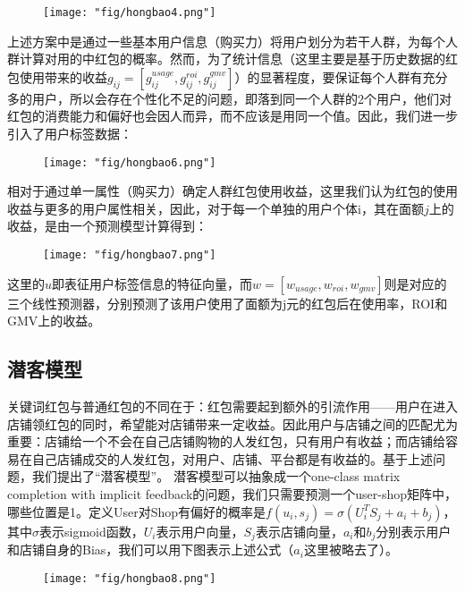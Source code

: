 \begin{figure}[!h]
	\centering
	\texttt{[image: "fig/hongbao4.png"]}
	\caption{}
	\label{fig:hongbao4}
\end{figure}

 
上述方案中是通过一些基本用户信息（购买力）将用户划分为若干人群，为每个人群计算对用的中红包的概率。然而，为了统计信息（这里主要是基于历史数据的红包使用带来的收益$g_{ij}=[g_{ij}^{usage},g_{ij}^{roi},g_{ij}^{gmv}]$）的显著程度，要保证每个人群有充分多的用户，所以会存在个性化不足的问题，即落到同一个人群的2个用户，他们对红包的消费能力和偏好也会因人而异，而不应该是用同一个值。因此，我们进一步引入了用户标签数据：


\begin{figure}[!h]
	\centering
	\texttt{[image: "fig/hongbao6.png"]}
	\caption{}
	\label{fig:hongbao6}
\end{figure}


相对于通过单一属性（购买力）确定人群红包使用收益，这里我们认为红包的使用收益与更多的用户属性相关，因此，对于每一个单独的用户个体i，其在面额$j$上的收益，是由一个预测模型计算得到：

\begin{figure}[!h]
	\centering
	\texttt{[image: "fig/hongbao7.png"]}
	\caption{}
	\label{fig:hongbao7}
\end{figure}
 
这里的$u$即表征用户标签信息的特征向量，而$w=[w_{usage},w_{roi},w_{gmv}]$则是对应的三个线性预测器，分别预测了该用户使用了面额为j元的红包后在使用率，ROI和GMV上的收益。

\subsection{潜客模型}
关键词红包与普通红包的不同在于：红包需要起到额外的引流作用——用户在进入店铺领红包的同时，希望能对店铺带来一定收益。因此用户与店铺之间的匹配尤为重要：店铺给一个不会在自己店铺购物的人发红包，只有用户有收益；而店铺给容易在自己店铺成交的人发红包，对用户、店铺、平台都是有收益的。基于上述问题，我们提出了“潜客模型”。
潜客模型可以抽象成一个one-class matrix completion with implicit feedback的问题，我们只需要预测一个user-shop矩阵中，哪些位置是1。定义User对Shop有偏好的概率是$f(u_{i},s_{j})=\sigma(U_{i}^{T}S_{j}+a_{i}+b_{j})$，其中$ \sigma $表示sigmoid函数，$ U_{i}$表示用户向量，$ S_{j}$表示店铺向量，$ a_{i}$和$ b_{j}$分别表示用户和店铺自身的Bias，我们可以用下图表示上述公式（$ a_{i} $这里被略去了）。

\begin{figure}[!h]
	\centering
	\texttt{[image: "fig/hongbao8.png"]}
	\caption{}
	\label{fig:hongbao8}
\end{figure}

